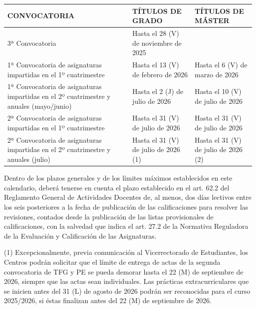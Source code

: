 \documentclass{article}
\begin{document}
\begin{itemize}
\begin{itemize}
\begin{scriptsize}
                  \vspace{0.4cm}
                  \begin{table}[h!]\centering\renewcommand{\arraystretch}{1.3}
                    \begin{tabular}{|p{}|p{}|p{}|}\hline
                      CONVOCATORIA                                                                           & TÍTULOS DE GRADO                     & TÍTULOS DE MÁSTER                    \\\hline
                      3ª Convocatoria                                                                        & Hasta el 28 (V) de noviembre de 2025 &                                      \\\hline
                      1ª Convocatoria de asignaturas impartidas en el 1º cuatrimestre                        & Hasta el 13 (V) de febrero de 2026   & Hasta el 6 (V) de marzo de 2026      \\\hline
                      1ª Convocatoria de asignaturas impartidas en el 2º cuatrimestre y anuales (mayo/junio) & Hasta el 2 (J) de julio de 2026      & Hasta el 10 (V) de julio de 2026     \\\hline
                      2ª Convocatoria de asignaturas impartidas en el 1º cuatrimestre                        & Hasta el 31 (V) de julio de 2026     & Hasta el 31 (V) de julio de 2026     \\\hline
                      2ª Convocatoria de asignaturas impartidas en el 2º cuatrimestre y anuales (julio)      & Hasta el 31 (V) de julio de 2026 (1) & Hasta el 31 (V) de julio de 2026 (2) \\\hline
                    \end{tabular}\end{table}
                  \vspace{0.4cm}

                  Dentro de los plazos generales y de los límites máximos establecidos en este calendario, deberá tenerse en cuenta el plazo establecido en el art. 62.2 del Reglamento General de Actividades Docentes de, al menos, dos días lectivos entre los seis posteriores a la fecha de publicación de las calificaciones para resolver las revisiones, contados desde la publicación de las listas provisionales de calificaciones, con la salvedad que indica el art. 27.2 de la Normativa Reguladora de la Evaluación y Calificación de las Asignaturas.

                  (1) Excepcionalmente, previa comunicación al Vicerrectorado de Estudiantes, los Centros podrán solicitar que el límite de entrega de actas de la segunda convocatoria de TFG y PE se pueda demorar hasta el 22 (M) de septiembre de 2026, siempre que las actas sean individuales. Las prácticas extracurriculares que se inicien antes del 31 (L) de agosto de 2026 podrán ser reconocidas para el curso 2025/2026, si éstas finalizan antes del 22 (M) de septiembre de 2026.


\end{scriptsize}
\end{itemize}
\end{itemize}
\end{document}
